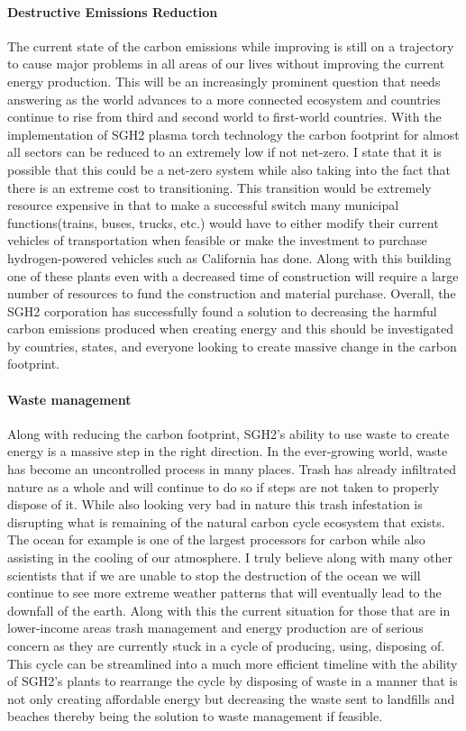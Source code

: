 \documentclass[3p,sort]{elsarticle}
\begin{document}
\paragraph{Destructive Emissions Reduction} The current state of the carbon emissions while improving 
is still on a trajectory to cause major problems in all areas of our lives without improving the 
current energy production. This will be an increasingly prominent question that needs answering as 
the world advances to a more connected ecosystem and countries continue to rise from third and second 
world to first-world countries. With the implementation of 
SGH2 plasma torch technology the carbon footprint for almost all sectors can be reduced to an extremely 
low if not net-zero. I state that it is possible 
that this could be a net-zero system while also 
taking into the fact that there is an extreme cost to transitioning. This transition would be extremely 
resource expensive in that to make a successful switch 
many municipal functions(trains, buses, trucks, etc.) would have to either modify their current vehicles 
of transportation when feasible or make the investment 
to purchase hydrogen-powered vehicles such as California has done. Along with this building one of these 
plants even with a decreased time of construction will 
require a large number of resources to fund the construction and material purchase. Overall, the SGH2 
corporation has successfully found a solution to decreasing 
the harmful carbon emissions produced when creating energy and this should be investigated by countries, 
states, and everyone looking to create massive change 
in the carbon footprint.
\citep{carbon}


\paragraph{Waste management} Along with reducing the carbon footprint, SGH2's ability to use waste to 
create energy is a massive step in the right direction. In the ever-growing world, waste has become 
an uncontrolled process in many places. Trash has already infiltrated nature as a whole and will 
continue to do so if steps are not taken to properly dispose of it. While also looking very bad in 
nature this trash infestation is disrupting what is remaining of the natural carbon cycle ecosystem 
that exists. 
The ocean for example is one of the largest processors for carbon while also assisting in the cooling 
of our atmosphere. I truly believe along with many other scientists that if we are unable to stop the 
destruction of the ocean we will continue to see more extreme weather patterns that will eventually 
lead to the downfall of the earth. Along with this the current situation for those that are in 
lower-income areas trash management and energy production are of serious concern as they are 
currently stuck in a cycle of producing, using, disposing of. This cycle can be streamlined into a 
much more efficient timeline with the ability of 
SGH2's plants to rearrange the cycle by disposing of waste in a manner that is not only creating 
affordable energy but decreasing the waste sent to landfills and beaches thereby being the solution 
to waste management if feasible.
\cite{sgh2site}
\end{document}
